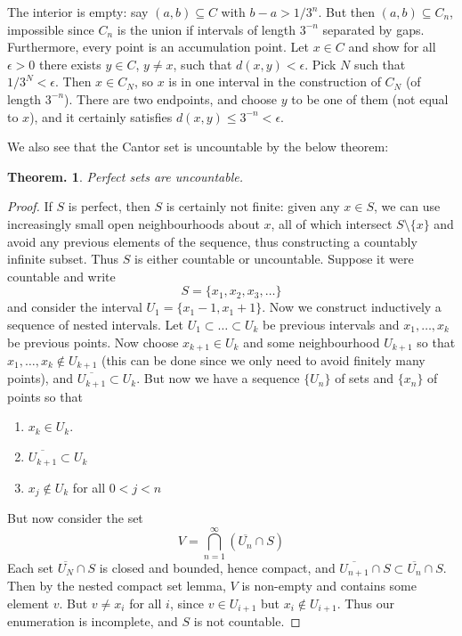 \documentclass[11pt, a4paper]{memoir}
\theoremstyle{change}
\newtheorem{theorem}{Theorem.}[section]
\theoremstyle{plain}
\theoremstyle{nonumberplain}
\newtheorem{proof}{Proof}
\numberwithin{equation}{section}
\begin{document}
The interior is empty: say $(a,b)\subseteq C$ with $b-a>1/3^n$. But then $(a,b)\subseteq C_n$, impossible since $C_n$ is the
union if intervals of length $3^{-n}$ separated by gaps. Furthermore, every point is an accumulation point. Let $x\in C$ and
show for all $\epsilon>0$ there exists $y\in C$, $y\neq x$, such that $d(x,y)<\epsilon$. Pick $N$ such that $1/3^N<\epsilon$.
Then $x\in C_N$, so $x$ is in one interval in the construction of $C_N$ (of length $3^{-n}$). There are two endpoints,
and choose $y$ to be one of them (not equal to $x$), and it certainly satisfies $d(x,y)\leq 3^{-n}<\epsilon$.
\begin{center}
\end{center}
We also see that the Cantor set is uncountable by the below theorem:
\begin{theorem}
    Perfect sets are uncountable.
\end{theorem}
\begin{proof}
    If $S$ is perfect, then $S$ is certainly not finite: given any $x\in S$, we can use increasingly small open
    neighbourhoods about $x$, all of which intersect $S\setminus\{x\}$ and avoid any previous elements of the sequence,
    thus constructing a countably infinite subset. Thus $S$ is either countable or uncountable. Suppose it were countable
    and write
    \[S=\{x_1,x_2,x_3,\ldots\}\]
    and consider the interval $U_1=\{x_1-1,x_1+1\}$. Now we construct inductively a sequence of nested intervals. Let
    $U_1\subset\ldots\subset U_k$ be previous intervals and $x_1,\ldots,x_k$ be previous points. Now choose $x_{k+1}\in U_k$
    and some neighbourhood $U_{k+1}$ so that $x_1,\ldots,x_k\notin U_{k+1}$ (this can be done since we only need to
    avoid finitely many points), and $\overline{U_{k+1}}\subset U_k$. But now we have a sequence $\{U_n\}$ of sets
    and $\{x_n\}$ of points so that
    \begin{enumerate}
        \item $x_k\in U_k$.
        \item $\overline{U_{k+1}}\subset U_k$
        \item $x_j\notin U_k$ for all $0<j<n$
    \end{enumerate}
    But now consider the set
    \[V=\bigcap_{n=1}^\infty \left( \overline{U_n}\cap S \right)\]
    Each set $\overline{U_N}\cap S$ is closed and bounded, hence compact, and $\overline{U_{n+1}}\cap S\subset\overline{U_{n}}\cap S$.
    Then by the nested compact set lemma, $V$ is non-empty and contains some element $v$. But $v\neq x_i$ for all $i$,
    since $v\in U_{i+1}$ but $x_i\notin U_{i+1}$. Thus our enumeration is incomplete, and $S$ is not countable.
\end{proof}
\end{document}
